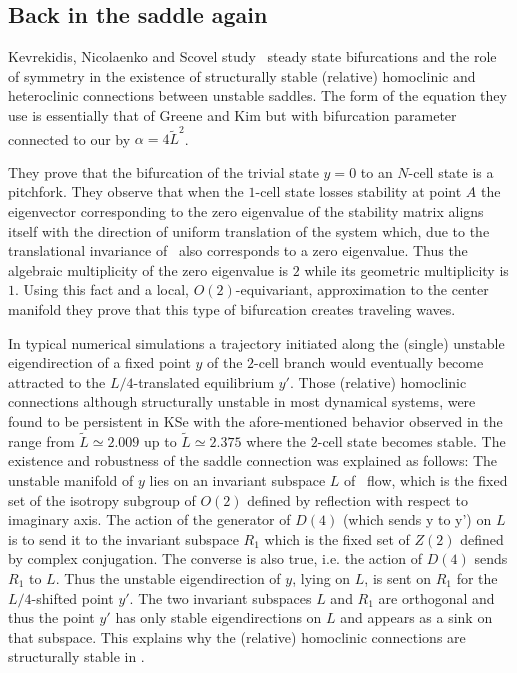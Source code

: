 \subsection{Back in the saddle again}

Kevrekidis, Nicolaenko and Scovel study \KSe\
steady state bifurcations and the role of symmetry in the
existence of structurally stable (relative) homoclinic and
heteroclinic connections between unstable saddles. The form  of
the equation they use is essentially that of Greene and Kim but
with bifurcation parameter connected to our by
$\alpha=4\tilde{L}^2$.


They prove that the bifurcation of the trivial state $y=0$ to
an $N$-cell state is a pitchfork. They observe that when the
$1$-cell state losses stability at point $A$ the eigenvector
corresponding to the zero eigenvalue of the stability matrix
aligns itself with the direction of uniform translation of the
system which, due to the translational invariance of \KSe\,
also corresponds to a zero eigenvalue. Thus the algebraic
multiplicity of the zero eigenvalue is $2$ while its geometric
multiplicity is $1$. Using this fact and a local,
$O(2)$-equivariant, approximation to the center manifold they
prove that this type of bifurcation creates traveling waves.

In typical numerical simulations  a trajectory initiated along
the (single) unstable eigendirection of a fixed point $y$ of
the $2$-cell branch would eventually become attracted to the
$L/4$-translated equilibrium $y'$. Those (relative) homoclinic
connections
although structurally unstable in most dynamical systems, were
found to be persistent in KSe with the afore-mentioned
behavior observed in the range from $\tilde{L}\simeq 2.009$ up
to $\tilde{L}\simeq 2.375$  where the $2$-cell state becomes
stable. The existence and robustness of the saddle connection
was explained as follows:  The unstable
manifold of $y$ lies on an invariant subspace $L$ of \KS\ flow,
which is the fixed set of the isotropy subgroup of $O(2)$
defined by reflection with respect to imaginary axis. The
action of the generator of $D(4)$ (which sends y to y') on $L$
is to send it to the invariant subspace $R_{1}$ which is the
fixed set of $Z(2)$ defined by complex conjugation. The
converse is also true, i.e. the action of $D(4)$ sends $R_{1}$
to $L$. Thus the unstable eigendirection of $y$, lying on $L$,
is sent on $R_{1}$ for the $L/4$-shifted point $y'$. The two
invariant subspaces $L$ and $R_{1}$ are orthogonal and thus the
point $y'$ has only stable eigendirections on $L$ and appears
as a sink on that subspace. This explains why the (relative)
homoclinic connections are structurally stable in \KSe.

